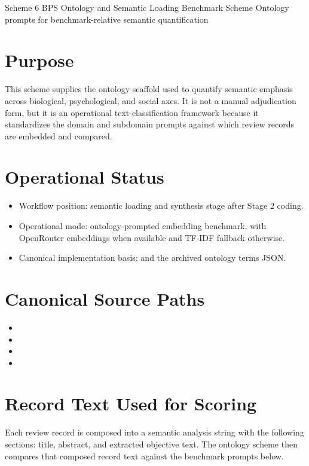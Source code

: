 \documentclass[11pt]{article}
\begin{document}
\schemeheader
  {Scheme 6}
  {BPS Ontology and Semantic Loading Benchmark Scheme}
  {Ontology prompts for benchmark-relative semantic quantification}

\section*{Purpose}
This scheme supplies the ontology scaffold used to quantify semantic emphasis across biological, psychological, and social axes. It is not a manual adjudication form, but it is an operational text-classification framework because it standardizes the domain and subdomain prompts against which review records are embedded and compared.

\section*{Operational Status}
\begin{itemize}
\item Workflow position: semantic loading and synthesis stage after Stage 2 coding.
\item Operational mode: ontology-prompted embedding benchmark, with OpenRouter embeddings when available and TF-IDF fallback otherwise.
\item Canonical implementation basis:  and the archived ontology terms JSON.
\end{itemize}

\section*{Canonical Source Paths}
\begin{itemize}
\item {}
\item {}
\item {}
\item {}
\end{itemize}

\section*{Record Text Used for Scoring}
Each review record is composed into a semantic analysis string with the following sections: title, abstract, and extracted objective text. The ontology scheme then compares that composed record text against the benchmark prompts below.
\end{document}
